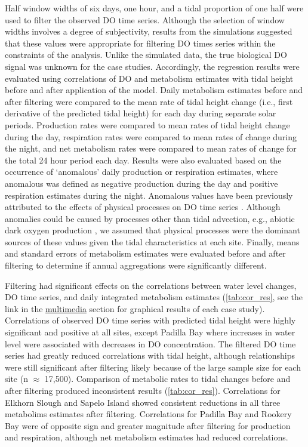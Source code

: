 \documentclass[letterpaper,12pt,oneside]{article}\usepackage[]{graphicx}\usepackage[]{color}
\begin{document}
Half window widths of six days, one hour, and a tidal proportion of one half were used to filter the observed \ac{DO} time series.  Although the selection of window widths involves a degree of subjectivity, results from the simulations suggested that these values were appropriate for filtering \ac{DO} times series within the constraints of the analysis. Unlike the simulated data, the true biological \ac{DO} signal was unknown for the case studies.  Accordingly, the regression results were evaluated  using correlations of \ac{DO} and metabolism estimates with tidal height before and after application of the model.  Daily metabolism estimates before and after filtering were compared to the mean rate of tidal height change (i.e., first derivative of the predicted tidal height) for each day during separate solar periods.  Production rates were compared to mean rates of tidal height change during the day, respiration rates were compared to mean rates of change during the night, and net metabolism rates were compared to mean rates of change for the total 24 hour period each day.  Results were also evaluated based on the occurrence of `anomalous' daily production or respiration estimates, where anomalous was defined as negative production during the day and positive respiration estimates during the night.  Anomalous values have been previously attributed to the effects of physical processes on \ac{DO} time series \citep{Caffrey03}. Although anomalies could be caused by processes other than tidal advection, e.g., abiotic dark oxygen production \citep{Pamatmat97}, we assumed that physical processes were the dominant sources of these values given the tidal characteristics at each site.  Finally, means and standard errors of metabolism estimates were evaluated before and after filtering to determine if annual aggregations were significantly different.   

Filtering had significant effects on the correlations between water level changes, \ac{DO} time series, and daily integrated metabolism estimates (\cref{tab:cor_res}, see the link in the \hyperref[multi]{multimedia} section for graphical results of each case study).  Correlations of observed \ac{DO} time series with predicted tidal height were highly significant and positive at all sites, except Padilla Bay where increases in water level were associated with decreases in \ac{DO}  concentration.  The filtered \ac{DO} time series had greatly reduced correlations with tidal height, although relationships were still significant after filtering likely because of the large sample size for each site (n $\approx$ 17,500). Comparison of metabolic rates to tidal changes before and after filtering produced inconsistent results (\cref{tab:cor_res}).  Correlations for Elkhorn Slough and Sapelo Island showed consistent reductions in all three metabolims estimates after filtering.  Correlations for Padilla Bay and Rookery Bay were of opposite sign and greater magnitude after filtering for production and respiration, although net metabolism estimates had reduced correlations.  
\end{document}
